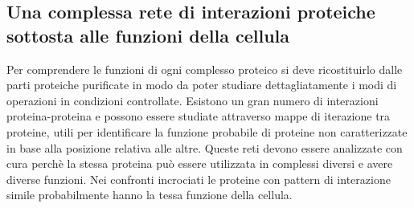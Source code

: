 \subsection{Una complessa rete di interazioni proteiche sottosta alle funzioni della cellula}
Per comprendere le funzioni di ogni complesso proteico si deve ricostituirlo dalle parti proteiche purificate in modo da poter studiare dettagliatamente i modi di operazioni in condizioni
controllate. Esistono un gran numero di interazioni proteina-proteina e possono essere studiate attraverso mappe di iterazione tra proteine, utili per identificare la funzione probabile 
di proteine non caratterizzate in base alla posizione relativa alle altre. Queste reti devono essere analizzate con cura perch\`e la stessa proteina pu\`o essere utilizzata in complessi
diversi e avere diverse funzioni. Nei confronti incrociati le proteine con pattern di interazione simile probabilmente hanno la tessa funzione della cellula. 
